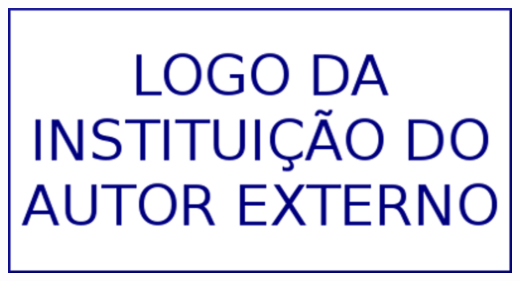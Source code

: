 \documentclass[%
  final,%
  english,%
  brazilian,%
]{beamer}
\begin{document}
\begin{frame}[t, fragile = singleslide]
\begin{columns}[t, onlytextwidth]
\begin{column}{0.1\textwidth}
\begin{flushright}
\vspace*{0.5\baselineskip}
\includegraphics[width = \columnwidth]{./Logos/inst-ext}%
\end{flushright}
\end{column}
%
\end{columns}%


\end{frame}
\end{document}
